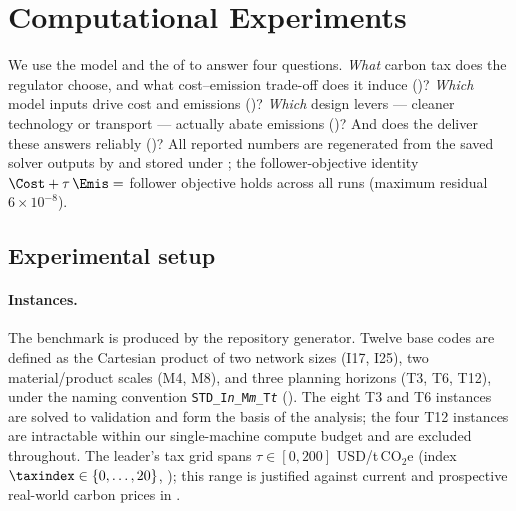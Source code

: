 
\section{Computational Experiments}
\label{sec:experiments}

We use the model and the \DBP of  to answer
four questions. \emph{What} carbon tax does the regulator choose, and what
cost--emission trade-off does it induce ()?
\emph{Which} model inputs drive cost and emissions
()? \emph{Which} design levers --- cleaner
technology or transport --- actually abate emissions
()? And does the \DBP deliver these answers reliably
()? All reported numbers are regenerated from the
saved solver outputs by  and
stored under ; the follower-objective identity
$\Cost+\tau\,\Emis=$ follower objective holds across all runs (maximum
residual $6\times10^{-8}$).

\subsection{Experimental setup}
\label{sec:exp:setup}

\paragraph{Instances.}
The benchmark is produced by the repository generator. Twelve base codes are
defined as the Cartesian product of two network sizes (I17, I25), two
material/product scales (M4, M8), and three planning horizons (T3, T6, T12),
under the naming convention \texttt{STD\_I\textit{n}\_M\textit{m}\_T\textit{t}}
(). The eight T3 and T6 instances are solved to
validation and form the basis of the analysis; the four T12 instances are
intractable within our single-machine compute budget and are excluded
throughout. The leader's tax grid spans $\tau\in[0,200]$ USD/t\,CO$_2$e
(index $\taxindex\in\{0,\ldots,20\}$, ); this range
is justified against current and prospective real-world carbon prices in
.

\begin{table}[ht]
  \centering
  \caption{Generated benchmark-instance codes.}
  \label{tab:instances}
  
\end{table}

